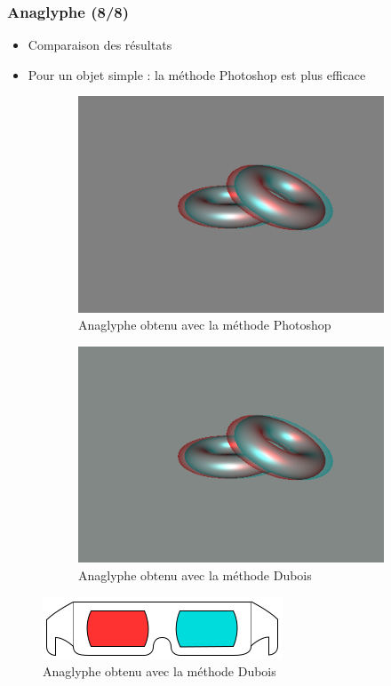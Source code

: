 \documentclass{beamer}
\begin{document}
% 
\begin{frame}
	\frametitle{Anaglyphe (8/8)}
	\begin{itemize}[label=$\bullet$]
		\item Comparaison des résultats 
		\item Pour un objet simple : la méthode Photoshop est plus efficace
	\end{itemize}
	\begin{figure}
		\centering
		\caption{Comparaison des deux résultats avec un objet simple peu détaillé}
		\begin{subfigure}{.5\textwidth}
			\centering
			\includegraphics[width=.9\linewidth]{donuts_photoshop.png}
			\caption{Anaglyphe obtenu avec la méthode Photoshop}
		\end{subfigure}%
		\begin{subfigure}{.5\textwidth}
			\centering
			\includegraphics[width=.9\linewidth]{donuts_dubois.png}
			\caption{Anaglyphe obtenu avec la méthode Dubois}
		\end{subfigure}
		\includegraphics[scale=0.2]{lunettes.png}
	\end{figure}
\end{frame}
\end{document}

